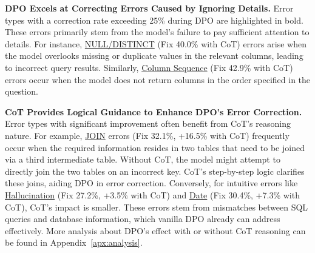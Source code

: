 
\textbf{DPO Excels at Correcting Errors Caused by Ignoring Details.} Error types with a correction rate exceeding 25\% during DPO are highlighted in bold. These errors primarily stem from the model's failure to pay sufficient attention to details. For instance, \underline{NULL/DISTINCT} (Fix 40.0\% with CoT) errors arise when the model overlooks missing or duplicate values in the relevant columns, leading to incorrect query results. Similarly, \underline{Column Sequence} (Fix 42.9\% with CoT) errors occur when the model does not return columns in the order specified in the question. 



\textbf{CoT Provides Logical Guidance to Enhance DPO's Error Correction.} Error types with significant improvement often benefit from CoT's reasoning nature. For example, \underline{JOIN} errors (Fix 32.1\%, +16.5\% with CoT) frequently occur when the required information resides in two tables that need to be joined via a third intermediate table. Without CoT, the model might attempt to directly join the two tables on an incorrect key. CoT's step-by-step logic clarifies these joins, aiding DPO in error correction. Conversely, for intuitive errors like \underline{Hallucination} (Fix 27.2\%, +3.5\% with CoT) and \underline{Date} (Fix 30.4\%, +7.3\% with CoT), CoT's impact is smaller. These errors stem from mismatches between SQL queries and database information, which vanilla DPO already can address effectively.
More analysis about DPO's effect with or without CoT reasoning can be found in Appendix~\ref{apx:analysis}.

